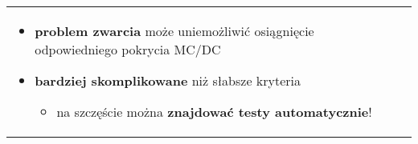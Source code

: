 \documentclass[../main.tex]{subfiles}
\begin{document}
\begin{table}[H]
\begin{center}
\begin{tabular}{p{8cm} p{8cm}}
\begin{itemize}
\begin{itemize}
                    \end{itemize}
                    \item \textbf{problem zwarcia} może uniemożliwić osiągnięcie
                    odpowiedniego pokrycia MC/DC
                    \item \textbf{bardziej skomplikowane} niż słabsze kryteria
                    \begin{itemize}
                        \item na szczęście można \textbf{znajdować testy automatycznie}!
                    \end{itemize}
                \end{itemize}
            \end{tabular}
        \end{center}
    \end{table}
\end{document}
